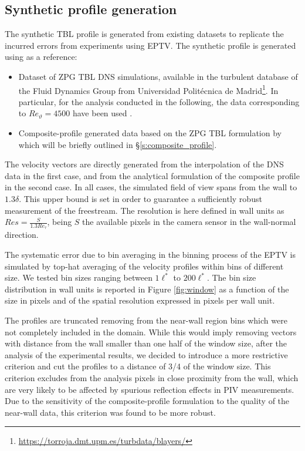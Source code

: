 \subsection{Synthetic profile generation} \label{ss:synthetic_method}

The synthetic TBL profile is generated from existing datasets to replicate the incurred errors from experiments using EPTV. The synthetic profile is generated using as a reference:

\begin{itemize}
    \item Dataset of {ZPG TBL} DNS simulations, available in the turbulent database of the Fluid Dynamics Group from Universidad Politécnica de Madrid\footnote{\url{https://torroja.dmt.upm.es/turbdata/blayers/}}. In particular, for the analysis conducted in the following, the data corresponding to $Re_{\vartheta}=4500$ have been used \citep{sillero2013one}.
    \item Composite-profile generated data based on the ZPG TBL formulation by \citet{Chauhan:2009p10824} which will be briefly outlined in \S \ref{s:composite_profile}.
\end{itemize}

{The velocity vectors are directly generated from the interpolation of the DNS data in the first case, and from the analytical formulation of the composite profile in the second case.} In all cases, the simulated field of view spans from the wall to $1.3\delta$. This upper bound is set in order to guarantee a sufficiently robust measurement of the freestream. The resolution is here defined in wall units as {$Res = \frac{S}{1.3 Re_\tau}$}, being $S$ the available pixels in the camera sensor in the wall-normal direction. 

The systematic error due to bin averaging in the binning process of the EPTV is simulated by top-hat averaging of the velocity profiles within bins of different size. We tested bin sizes ranging between {$1\ell^*$ to $200\ell^*$}. The bin size distribution in wall units is reported in Figure \ref{fig:window} as a function of the size in pixels and of the spatial resolution expressed in pixels per wall unit.

The profiles are truncated removing from the near-wall region bins which were not completely included in the domain. While this would imply removing vectors with distance from the wall smaller than one half of the window size, after the analysis of the experimental results, we decided to introduce a more restrictive criterion and cut the profiles to a distance of 3/4 of the window size. This criterion excludes from the analysis pixels in close proximity from the wall, which are very likely to be affected by spurious reflection effects in PIV measurements. Due to the sensitivity of the composite-profile formulation to the quality of the near-wall data, this criterion was found to be more robust. 

